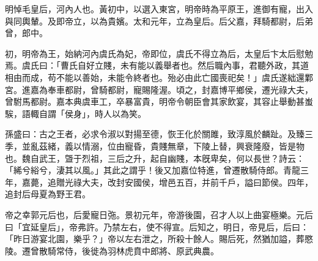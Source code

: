 
\begin{pinyinscope}
明悼毛皇后，河內人也。黃初中，以選入東宮，明帝時為平原王，進御有寵，出入與同輿輦。及即帝立，以為貴嬪。太和元年，立為皇后。后父嘉，拜騎都尉，后弟曾，郎中。

初，明帝為王，始納河內虞氏為妃，帝即位，虞氏不得立為后，太皇后卞太后慰勉焉。虞氏曰：「曹氏自好立賤，未有能以義舉者也。然后職內事，君聽外政，其道相由而成，苟不能以善始，未能令終者也。殆必由此亡國喪祀矣！」虞氏遂絀還鄴宮。進嘉為奉車都尉，曾騎都尉，寵賜隆渥。頃之，封嘉博平鄉侯，遷光祿大夫，曾駙馬都尉。嘉本典虞車工，卒暴富貴，明帝令朝臣會其家飲宴，其容止舉動甚蚩騃，語輙自謂「侯身」，時人以為笑。

孫盛曰：古之王者，必求令淑以對揚至德，恢王化於關雎，致淳風於麟趾。及臻三季，並亂茲緒，義以情溺，位由寵昏，貴賤無章，下陵上替，興衰隆廢，皆是物也。魏自武王，曁于烈祖，三后之升，起自幽賤，本旣卑矣，何以長世？詩云：「絺兮綌兮，淒其以風。」其此之謂乎！後又加嘉位特進，曾遷散騎侍郎。青龍三年，嘉薨，追贈光祿大夫，改封安國侯，增邑五百，并前千戶，謚曰節侯。四年，追封后母夏為野王君。

帝之幸郭元后也，后愛寵日㢮。景初元年，帝游後園，召才人以上曲宴極樂。元后曰「宜延皇后」，帝弗許。乃禁左右，使不得宣。后知之，明日，帝見后，后曰：「昨日游宴北園，樂乎？」帝以左右泄之，所殺十餘人。賜后死，然猶加謚，葬愍陵。遷曾散騎常侍，後徙為羽林虎賁中郎將、原武典農。


\end{pinyinscope}